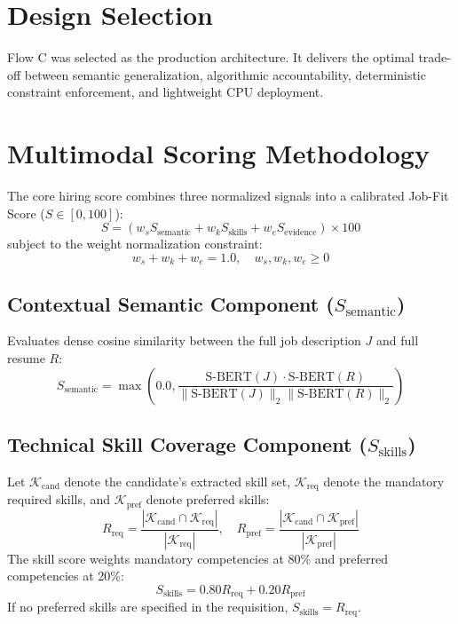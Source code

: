\documentclass[12pt,a4paper]{report}
\begin{document}
\section{Design Selection}
Flow C was selected as the production architecture. It delivers the optimal trade-off between semantic generalization, algorithmic accountability, deterministic constraint enforcement, and lightweight CPU deployment.

\section{Multimodal Scoring Methodology}
The core hiring score combines three normalized signals into a calibrated Job-Fit Score ($S \in [0, 100]$):
\begin{equation}
S = \left( w_s S_{\text{semantic}} + w_k S_{\text{skills}} + w_e S_{\text{evidence}} \right) \times 100
\end{equation}
subject to the weight normalization constraint:
\begin{equation}
w_s + w_k + w_e = 1.0, \quad w_s, w_k, w_e \ge 0
\end{equation}

\subsection{Contextual Semantic Component ($S_{\text{semantic}}$)}
Evaluates dense cosine similarity between the full job description $J$ and full resume $R$:
\begin{equation}
S_{\text{semantic}} = \max\left(0.0, \frac{\text{S-BERT}(J) \cdot \text{S-BERT}(R)}{\|\text{S-BERT}(J)\|_2 \|\text{S-BERT}(R)\|_2}\right)
\end{equation}

\subsection{Technical Skill Coverage Component ($S_{\text{skills}}$)}
Let $\mathcal{K}_{\text{cand}}$ denote the candidate's extracted skill set, $\mathcal{K}_{\text{req}}$ denote the mandatory required skills, and $\mathcal{K}_{\text{pref}}$ denote preferred skills:
\begin{equation}
R_{\text{req}} = \frac{|\mathcal{K}_{\text{cand}} \cap \mathcal{K}_{\text{req}}|}{|\mathcal{K}_{\text{req}}|}, \quad R_{\text{pref}} = \frac{|\mathcal{K}_{\text{cand}} \cap \mathcal{K}_{\text{pref}}|}{|\mathcal{K}_{\text{pref}}|}
\end{equation}
The skill score weights mandatory competencies at 80\% and preferred competencies at 20\%:
\begin{equation}
S_{\text{skills}} = 0.80 R_{\text{req}} + 0.20 R_{\text{pref}}
\end{equation}
If no preferred skills are specified in the requisition, $S_{\text{skills}} = R_{\text{req}}$.
\end{document}
